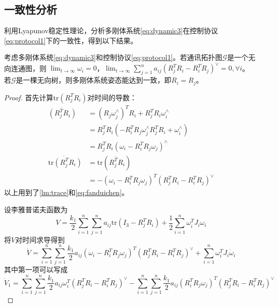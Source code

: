 \subsection{一致性分析}
利用Lyapunov稳定性理论，分析多刚体系统\ref{eq:dynamic3}在控制协议\ref{eq:protocol1}下的一致性，得到以下结果。
\begin{theorem}
    考虑多刚体系统\ref{eq:dynamic3}和控制协议\ref{eq:protocol1}。若通讯拓扑图$\mathcal{G}$是一个无向连通图，则
    $\lim_{t\rightarrow\infty}\omega_i=0$，$\lim_{t\rightarrow\infty}\sum_{j=1}^na_{ij}(R_j^TR_i-R_i^TR_j)^\vee=0,\forall i$。
    若$\mathcal{G}$是一棵无向树，则多刚体系统姿态能达到一致，即$R_i=R_j$。
    \begin{proof}
        
        首先计算$\text{tr}(R_j^TR_i)$对时间的导数：
        \begin{equation}
            \begin{aligned}
                \dot{(R_j^TR_i)}&=(R_j\omega_j^\wedge)^TR_i+R_j^TR_i\omega_i^\wedge\\
                &=R_j^TR_i(-R_i^TR_j\omega_j^\wedge R_j^TR_i+\omega_i^\wedge)\\
                &=R_j^TR_i(\omega_i-R_i^TR_j\omega_j)^\wedge\\
                \dot{\text{tr}(R_j^TR_i)}&=\text{tr}(\dot{R_j^TR_i})\\
                &=-(\omega_i-R_i^TR_j\omega_j)^T(R_j^TR_i-R_i^TR_j)^\vee
            \end{aligned}
        \end{equation}
        以上用到了\ref{lm:trace}和\ref{eq:fanduichen}。

        设李雅普诺夫函数为
        \begin{equation}
            V=\frac{k_1}{2}\sum_{i=1}^n \sum_{j=1}^n a_{ij}\text{tr}(I_3-R_j^TR_i)+\frac{1}{2}\sum_{i=1}^n\omega_i^TJ_i\omega_i
        \end{equation}
        将$V$对时间求导得到
        \begin{equation}
            \dot V=\sum_{i=1}^n\sum_{j=1}^n\frac{k_1}{2}a_{ij}(\omega_i-R_i^TR_j\omega_j)^T(R_j^TR_i-R_i^TR_j)^\vee+\sum_{i=1}^n\omega_i^TJ_i\dot\omega_i
        \end{equation}
        其中第一项可以写成
        \begin{equation}
            \dot V_1=\sum_{i=1}^n\sum_{j=1}^n\frac{k_1}{2}a_{ij}\omega_i^T(R_j^TR_i-R_i^TR_j)^\vee-\sum_{i=1}^n\sum_{j=1}^n\frac{k_1}{2}a_{ij}(R_i^TR_j\omega_j)^T(R_j^TR_i-R_i^TR_j)^\vee
        \end{equation}


\end{proof}
\end{theorem}
